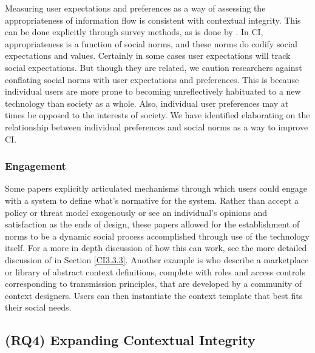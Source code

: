 \documentclass[../thesis.tex]{subfiles}
\begin{document}
Measuring user expectations and preferences as a way of assessing the
appropriateness of information flow is consistent with contextual
integrity. This can be done explicitly through survey methods, as is
done by \citet{shvartzshnaider2016learning}. In
CI, appropriateness is a function of social norms, and these norms do
codify social expectations and values. Certainly in some cases user
expectations will track social expectations. But though they are
related, we caution researchers against conflating social norms with
user expectations and preferences. This is because individual users are
more prone to becoming unreflectively habituated to a new technology
than society as a whole. Also, individual user preferences may at times
be opposed to the interests of society. We have identified elaborating
on the relationship between individual preferences and social norms as
a way to improve CI.


\subsubsection{Engagement}
\label{CI4.3.4}

Some papers explicitly articulated mechanisms through which users could
engage with a system to define what's normative for the
system. Rather than accept a policy or threat model exogenously or see
an individual's opinions and satisfaction as the ends
of design, these papers allowed for the establishment of norms to be a
dynamic social process accomplished through use of the technology
itself. For a more in depth discussion of how this can work, see the
more detailed discussion of \citet{criado2015implicit} in
Section \ref{CI3.3.3}.
Another example is \citet{tierney2014realizing} who describe a
marketplace or library of abstract context definitions, complete with
roles and access controls corresponding to transmission principles,
that are developed by a community of context designers. Users can then
instantiate the context template that best fits their social needs.

\subsection{(RQ4) Expanding Contextual Integrity}
\label{CI4.4}
\end{document}
